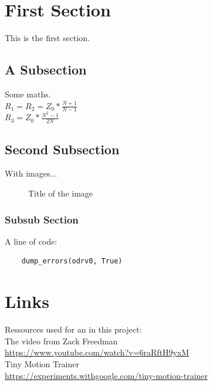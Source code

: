 \documentclass[a4paper,titlepage]{article}
\begin{document}
\section{First Section}
This is the first section.

\subsection{A Subsection}
Some maths. \\

$R_{1} = R_{2} = Z_{0} * \frac{N + 1}{N - 1} $\\

$R_{3} = Z_{0} * \frac{N^2 - 1}{2N} $\\

\subsection{Second Subsection}

With images...

\begin{figure}[H]
    \caption{Title of the image}
\end{figure}

\subsubsection{Subsub Section}
A line of code:

\begin{lstlisting}
    dump_errors(odrv0, True)
\end{lstlisting}

\newpage
\section{Links}

Ressources used for an in this project: \\

The video from Zack Freedman \\
\href{https://www.youtube.com/watch?v=6raRftH9yxM}{https://www.youtube.com/watch?v=6raRftH9yxM} \\

Tiny Motion Trainer \\
\href{https://experiments.withgoogle.com/tiny-motion-trainer}{https://experiments.withgoogle.com/tiny-motion-trainer} \\
\end{document}
